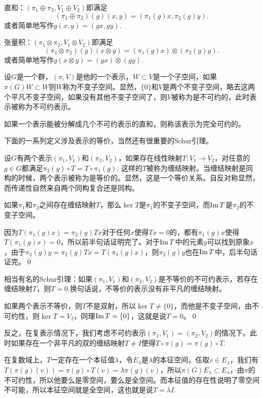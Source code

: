 \documentclass[9pt]{extarticle}
\begin{document}
 直和：$(\pi_1\oplus \pi_2,V_1\oplus V_2)$即满足
\[
	(\pi_1\oplus \pi_2)(g)(x,y)=(\pi_1(g)x,\pi_2(g)y).
\]
或者简单地写作$g(x,y)=(gx,gy)$.

 张量积：$(\pi_1\otimes \pi_2,V_1\otimes V_2)$即满足
\[
	(\pi_1\otimes \pi_2)(g)(x\otimes y)=(\pi_1(g)x)\otimes (\pi_2(g)y).
\]
或者简单地写作$g(x\otimes y)=(gx)\otimes(gy)$.

\para 设$G$是一个群，$(\pi,V)$是他的一个表示，$W\subset V$是一个子空间，如果$\pi(G)W\subset W$则$W$称为不变子空间。显然，$\{0\}$和$V$是两个不变子空间，略去这两个平凡不变子空间，如果没有其他不变子空间了，则$V$被称为是不可约的，此时表示被称为不可约表示。

\para 如果一个表示能被分解成几个不可约表示的直和，则称该表示为完全可约的。

下面的一系列定义涉及表示的等价，当然还有很重要的Schur引理。

\para 设$G$有两个表示$(\pi_1,V_1)$和$(\pi_2,V_2)$，如果存在线性映射$T:V_1\to V_2$，对任意的$g\in G$都满足$\pi_2(g)\circ T=T\circ \pi_1(g)$. 这样的$T$被称为缠结映射。当缠结映射是同构的时候，两个表示被称为是等价的。显然，这是一个等价关系。自反对称显然，而传递性自然来自两个同构复合还是同构。

\lem 如果$\pi_1$和$\pi_2$之间存在缠结映射$T$，那么$\ker T$是$\pi_1$的不变子空间，而$\operatorname{Im} T$是$\pi_2$的不变子空间。

\proof 因为$T(\pi_1(g)x)=\pi_2(g)Tx$对于任何$x$使得$Tx=0$的，都有$\pi_1(g)x$使得$T(\pi_1(g)x)=0$，所以前半句话证明完了。对于$\operatorname{Im} T$中的元素$y$可以找到原象$x$，由于$\pi_2(g)y=\pi_2(g)Tx=T(\pi_1(g)x)$，则$\pi_2(g)y$也在$\operatorname{Im} T$中，后半句话证完。\qed

\lem 相当有名的Schur引理：如果$(\pi_1,V_1)$和$(\pi_2,V_2)$是不等价的不可约表示，若存在缠结映射$T$，则$T=0$.换句话说，不等价的表示没有非平凡的缠结映射。

\proof 如果两个表示不等价，则$T$不是双射，所以$\ker T\neq \{0\}$，而他是不变子空间，由不可约性，则$\ker T= V_2$，同理$\operatorname{Im}  T= \{0\}$，这就是说$T=0$。\qed

\para 反之，在复表示情况下，我们考虑不可约表示$(\pi_1,V_1)=(\pi_2,V_2)$的情况下。此时如果存在一个非平凡的双的缠结映射$T\neq I$使得$T\circ \pi(g)=\pi(g)\circ T$.

在复数域上，$T$一定存在一个本征值$\lambda$，令$E_\lambda$是$\lambda$的本征空间，任取$v\in E_\lambda$，我们有$T(\pi(g)(v))=\pi(g)\circ T(v)=\lambda\pi(g)(v)$，所以$\pi(G)E_\lambda\subset E_\lambda$，由$\pi$的不可约性，所以他要么是零空间，要么是全空间。而本征值的存在性说明了零空间不可能，所以本征空间就是全空间，这也就是说$T=\lambda I$.
\end{document}
